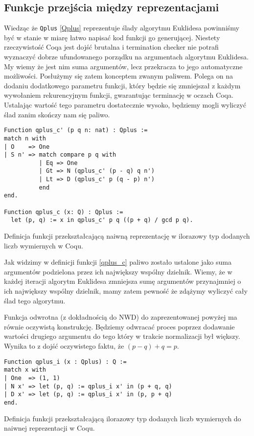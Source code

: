 \subsection{Funkcje przejścia między reprezentacjami}
Wiedząc że \texttt{Qplus} \ref{Qplus} reprezentuje ślady algorytmu Euklidesa powinniśmy być w stanie w miarę łatwo napisać kod funkcji go generującej. Niestety rzeczywistość Coqa jest dojść brutalna i termination checker nie potrafi wyznaczyć dobrze ufundowanego porządku na argumentach algorytmu Euklidesa. My wiemy że jest nim suma argumentów, lecz przekracza to jego automatyczne możliwości. Posłużymy się zatem konceptem zwanym paliwem. Polega on na dodaniu dodatkowego parametru funkcji, który będzie się zmniejszał z każdym wywołaniem rekurencyjnym funkcji, gwarantując terminację w oczach Coqa. Ustalając wartość tego parametru dostatecznie wysoko, będziemy mogli wyliczyć ślad zanim skończy nam się paliwo.
\begin{code}
\begin{verbatim}
Function qplus_c' (p q n: nat) : Qplus :=
match n with
| O    => One
| S n' => match compare p q with
          | Eq => One
          | Gt => N (qplus_c' (p - q) q n')
          | Lt => D (qplus_c' p (q - p) n')
          end
end.

Function qplus_c (x: Q) : Qplus :=
  let (p, q) := x in qplus_c' p q ((p + q) / gcd p q).
\end{verbatim}
\caption{Definicja funkcji przekształcającą naiwną reprezentację w ilorazowy typ dodanych liczb wymiernych w Coqu.}
\label{qplus_c}
\end{code}

Jak widzimy w definicji funkcji \ref{qplus_c} paliwo zostało ustalone jako suma argumentów podzielona przez ich największy wspólny dzielnik. Wiemy, że w każdej iteracji algorytm Euklidesa zmniejsza sumę argumentów przynajmniej o ich największy wspólny dzielnik, mamy zatem pewność że zdążymy wyliczyć cały ślad tego algorytmu.

Funkcja odwrotna (z dokładnością do NWD) do zaprezentowanej powyżej ma równie oczywistą konstrukcję. Będziemy odwracać proces poprzez dodawanie wartości drugiego argumentu do tego który w trakcie normalizacji był większy. Wynika to z dojść oczywistego faktu, że $(p - q) + q = p$.
\begin{code}
\begin{verbatim}
Function qplus_i (x : Qplus) : Q :=
match x with
| One  => (1, 1)
| N x' => let (p, q) := qplus_i x' in (p + q, q)
| D x' => let (p, q) := qplus_i x' in (p, p + q)
end.
\end{verbatim}
\caption{Definicja funkcji przekształcającą ilorazowy typ dodanych liczb wymiernych do naiwnej reprezentacji w Coqu.}
\label{qplus_c}
\end{code}
